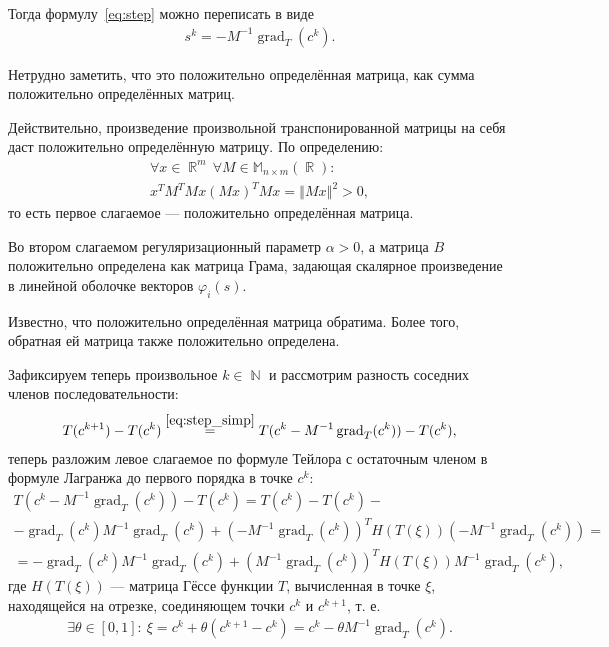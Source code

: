 \documentclass[a4paper,14pt]{extarticle}
\DeclareMathOperator{\RR}{\mathbb{R}}
\DeclareMathOperator{\NN}{\mathbb{N}}
\newcommand{\norm}[1]{\left\Vert #1 \right\Vert}
\begin{document}
    Тогда формулу~\eqref{eq:step} можно переписать в виде
    \begin{gather}\label{eq:step_simp}
        s^k = - M^{-1} \operatorname{grad}_T(c^k).
    \end{gather}

    Нетрудно заметить, что это положительно определённая матрица, как сумма
    положительно определённых матриц.

    Действительно, произведение произвольной транспонированной матрицы
    на себя даст положительно определённую матрицу.
    По определению:
    \begin{gather*}
        \forall x \in \RR^{m} \,
        \forall M \in \mathbb{M}_{n \times m}{(\RR)} : \\
        x^T M^T M x
        (M x)^T M x
        = \norm{M x}^2 > 0,
    \end{gather*}
    то есть первое слагаемое --- положительно определённая матрица.

    Во втором слагаемом регуляризационный параметр $\alpha > 0$,
    а матрица $B$ положительно определена как матрица Грама, задающая скалярное
    произведение в линейной оболочке векторов $\varphi_i(s)$.

    Известно, что положительно определённая матрица обратима.
    Более того, обратная ей матрица также положительно определена.

    Зафиксируем теперь произвольное $k \in \NN$ и рассмотрим разность соседних
    членов последовательности:
    \begin{gather*}
        T(c^{k+1})
        - T(c^{k})
        \overset{\eqref{eq:step_simp}}{=}
        T(c^{k} - M^{-1} \operatorname{grad}_T(c^k))
        - T(c^{k}),
    \end{gather*}
    теперь разложим левое слагаемое по формуле Тейлора с остаточным членом
    в формуле Лагранжа до первого порядка в точке $c^k$:
    \begin{gather*}
        T(c^{k} - M^{-1} \operatorname{grad}_T(c^k))
        - T(c^{k})
        = T(c^{k})
        - T(c^{k}) - \\
        - \operatorname{grad}_T(c^k) M^{-1} \operatorname{grad}_T(c^k)
        + (- M^{-1} \operatorname{grad}_T(c^k))^T
        H(T(\xi))
        (- M^{-1} \operatorname{grad}_T(c^k)) = \\
        = - \operatorname{grad}_T(c^k) M^{-1} \operatorname{grad}_T(c^k)
        + (M^{-1} \operatorname{grad}_T(c^k))^T
        H(T(\xi))
        M^{-1} \operatorname{grad}_T(c^k),
    \end{gather*}
    где $H(T(\xi))$ --- матрица Гёссе функции $T$, вычисленная в точке $\xi$,
    находящейся на отрезке, соединяющем точки $c^k$ и $c^{k+1}$, т. е.
    \begin{gather*}
        \exists \theta \in [0, 1]: \
        \xi = c^k + \theta(c^{k+1} - c^{k})
        = c^{k} - \theta M^{-1} \operatorname{grad}_T(c^k).
    \end{gather*}
\end{document}
